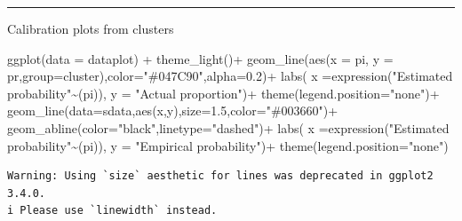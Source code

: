 \documentclass[
  letterpaper,
  DIV=11,
  numbers=noendperiod]{scrartcl}
\newenvironment{Shaded}{\begin{snugshade}}{\end{snugshade}}
\newcommand{\AttributeTok}[1]{\textcolor[rgb]{0.65,0.35,0.00}{#1}}
\newcommand{\FloatTok}[1]{\textcolor[rgb]{0.65,0.35,0.00}{#1}}
\newcommand{\FunctionTok}[1]{\textcolor[rgb]{0.02,0.16,0.49}{#1}}
\newcommand{\NormalTok}[1]{\textcolor[rgb]{0.33,0.33,0.33}{#1}}
\newcommand{\SpecialCharTok}[1]{\textcolor[rgb]{0.00,0.46,0.62}{#1}}
\newcommand{\StringTok}[1]{\textcolor[rgb]{0.00,0.50,0.00}{#1}}
\begin{document}
\begin{center}\rule{0.5\linewidth}{0.5pt}\end{center}

{ Calibration plots from clusters}

\begin{Shaded}
\begin{Highlighting}[]
\FunctionTok{ggplot}\NormalTok{(}\AttributeTok{data =}\NormalTok{ dataplot) }\SpecialCharTok{+}
  \FunctionTok{theme\_light}\NormalTok{()}\SpecialCharTok{+}
  \FunctionTok{geom\_line}\NormalTok{(}\FunctionTok{aes}\NormalTok{(}\AttributeTok{x =}\NormalTok{ pi, }\AttributeTok{y =}\NormalTok{ pr,}\AttributeTok{group=}\NormalTok{cluster),}\AttributeTok{color=}\StringTok{"\#047C90"}\NormalTok{,}\AttributeTok{alpha=}\FloatTok{0.2}\NormalTok{)}\SpecialCharTok{+}
  \FunctionTok{labs}\NormalTok{( }\AttributeTok{x =}\FunctionTok{expression}\NormalTok{(}\StringTok{"Estimated probability"}\SpecialCharTok{\textasciitilde{}}\NormalTok{(pi)),}
        \AttributeTok{y =} \StringTok{"Actual proportion"}\NormalTok{)}\SpecialCharTok{+}
  \FunctionTok{theme}\NormalTok{(}\AttributeTok{legend.position=}\StringTok{"none"}\NormalTok{)}\SpecialCharTok{+}
  \FunctionTok{geom\_line}\NormalTok{(}\AttributeTok{data=}\NormalTok{sdata,}\FunctionTok{aes}\NormalTok{(x,y),}\AttributeTok{size=}\FloatTok{1.5}\NormalTok{,}\AttributeTok{color=}\StringTok{"\#003660"}\NormalTok{)}\SpecialCharTok{+}
  \FunctionTok{geom\_abline}\NormalTok{(}\AttributeTok{color=}\StringTok{"black"}\NormalTok{,}\AttributeTok{linetype=}\StringTok{"dashed"}\NormalTok{)}\SpecialCharTok{+}
   \FunctionTok{labs}\NormalTok{( }\AttributeTok{x =}\FunctionTok{expression}\NormalTok{(}\StringTok{"Estimated probability"}\SpecialCharTok{\textasciitilde{}}\NormalTok{(pi)),}
        \AttributeTok{y =} \StringTok{"Empirical probability"}\NormalTok{)}\SpecialCharTok{+}
  \FunctionTok{theme}\NormalTok{(}\AttributeTok{legend.position=}\StringTok{"none"}\NormalTok{)}
\end{Highlighting}
\end{Shaded}

\begin{verbatim}
Warning: Using `size` aesthetic for lines was deprecated in ggplot2 3.4.0.
i Please use `linewidth` instead.
\end{verbatim}
\end{document}
